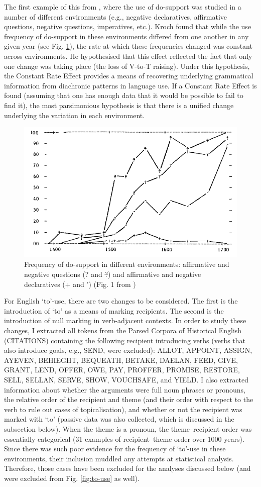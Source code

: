 	The first example of this from \cite{Kroch.1989}, where the use of do-support was studied in a number of different environments (e.g., negative declaratives, affirmative questions, negative questions, imperatives, etc.). Kroch found that while the use frequency of do-support in these environments differed from one another in any given year (see Fig. \ref{fig:kroch-graph}), the rate at which these frequencies changed was constant across environments. He hypothesised that this effect reflected the fact that only one change was taking place (the loss of V-to-T raising). Under this hypothesis, the Constant Rate Effect provides a means of recovering underlying grammatical information from diachronic patterns in language use. If a Constant Rate Effect is found (assuming that one has enough data that it would be possible to fail to find it), the most parsimonious hypothesis is that there is a unified change underlying the variation in each environment.

	\begin{figure}[ht!]
		\includegraphics[width=.5\linewidth]{../images/kroch-graph}
		\caption{Frequency of do-support in different environments: affirmative and negative questions (? and \sout{?}) and affirmative and negative declaratives (+ and ') (Fig. 1 from \citealt{Kroch.1989})}
		\label{fig:kroch-graph}
	\end{figure}

	For English `to'-use, there are two changes to be considered. The first is the introduction of `to' as a means of marking recipients. The second is the introduction of null marking in verb-adjacent contexts. In order to study these changes, I extracted all tokens from the Parsed Corpora of Historical English (CITATIONS) containing the following recipient introducing verbs (verbs that also introduce goals, e.g., SEND, were excluded): ALLOT, APPOINT, ASSIGN, AYEVEN, BEHIEGHT, BEQUEATH, BETAKE, DAELAN, FEED, GIVE, GRANT, LEND, OFFER, OWE, PAY, PROFFER, PROMISE, RESTORE, SELL, SELLAN, SERVE, SHOW, VOUCHSAFE, and YIELD. I also extracted information about whether the arguments were full noun phrases or pronouns, the relative order of the recipient and theme (and their order with respect to the verb to rule out cases of topicalisation), and whether or not the recipient was marked with `to' (passive data was also collected, which is discussed in the subsection below). When the theme is a pronoun, the theme--recipient order was essentially categorical (31 examples of recipient--theme order over 1000 years). Since there was such poor evidence for the frequency of `to'-use in these environments, their inclusion muddled any attempts at statistical analysis. Therefore, those cases have been excluded for the analyses discussed below (and were excluded from Fig. \ref{fig:to-use} as well).

